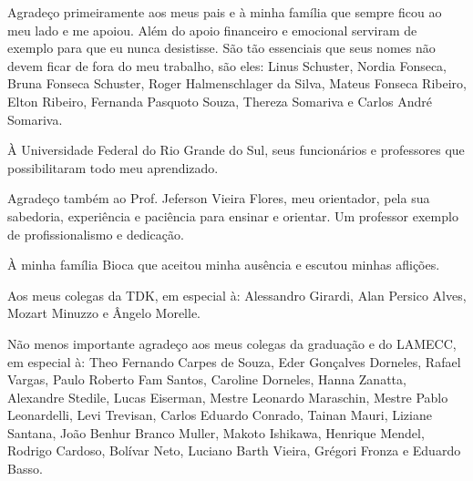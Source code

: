 


\begin{agradecimentos}
Agradeço primeiramente aos meus pais e à minha família que sempre ficou ao meu lado e me apoiou. Além do apoio financeiro e emocional serviram de exemplo para que eu nunca desistisse. São tão essenciais que seus nomes não devem ficar de fora do meu trabalho, são eles: Linus Schuster, Nordia Fonseca, Bruna Fonseca Schuster, Roger Halmenschlager da Silva, Mateus Fonseca Ribeiro, Elton Ribeiro, Fernanda Pasquoto Souza, Thereza Somariva e Carlos André Somariva.

À Universidade Federal do Rio Grande do Sul, seus funcionários e professores que possibilitaram todo meu aprendizado.

Agradeço também ao Prof. Jeferson Vieira Flores, meu orientador, pela sua sabedoria, experiência e paciência para ensinar e orientar. Um professor exemplo de profissionalismo e dedicação. 

À minha família Bioca que aceitou minha ausência e escutou minhas aflições. 

Aos meus colegas da TDK, em especial à: Alessandro Girardi, Alan Persico Alves, Mozart Minuzzo e Ângelo Morelle. 

Não menos importante agradeço aos meus colegas da graduação e do LAMECC, em especial à: Theo Fernando Carpes de Souza, Eder Gonçalves Dorneles, Rafael Vargas, Paulo Roberto Fam Santos, Caroline Dorneles, Hanna Zanatta, Alexandre Stedile, Lucas Eiserman, Mestre Leonardo Maraschin, Mestre Pablo Leonardelli, Levi Trevisan, Carlos Eduardo Conrado, Tainan Mauri, Liziane Santana, João Benhur Branco Muller, Makoto Ishikawa, Henrique Mendel, Rodrigo Cardoso, Bolívar Neto, Luciano Barth Vieira, Grégori Fronza e Eduardo Basso.   

\end{agradecimentos}

